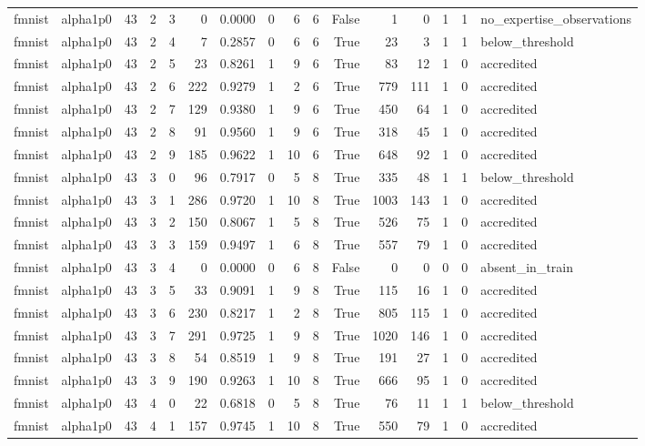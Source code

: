 \begin{tabular}{llrrrrrrrrrrrrrl}
fmnist & alpha1p0 & 43 & 2 & 3 & 0 & 0.0000 & 0 & 6 & 6 & False & 1 & 0 & 1 & 1 & no\_expertise\_observations \\
fmnist & alpha1p0 & 43 & 2 & 4 & 7 & 0.2857 & 0 & 6 & 6 & True & 23 & 3 & 1 & 1 & below\_threshold \\
fmnist & alpha1p0 & 43 & 2 & 5 & 23 & 0.8261 & 1 & 9 & 6 & True & 83 & 12 & 1 & 0 & accredited \\
fmnist & alpha1p0 & 43 & 2 & 6 & 222 & 0.9279 & 1 & 2 & 6 & True & 779 & 111 & 1 & 0 & accredited \\
fmnist & alpha1p0 & 43 & 2 & 7 & 129 & 0.9380 & 1 & 9 & 6 & True & 450 & 64 & 1 & 0 & accredited \\
fmnist & alpha1p0 & 43 & 2 & 8 & 91 & 0.9560 & 1 & 9 & 6 & True & 318 & 45 & 1 & 0 & accredited \\
fmnist & alpha1p0 & 43 & 2 & 9 & 185 & 0.9622 & 1 & 10 & 6 & True & 648 & 92 & 1 & 0 & accredited \\
fmnist & alpha1p0 & 43 & 3 & 0 & 96 & 0.7917 & 0 & 5 & 8 & True & 335 & 48 & 1 & 1 & below\_threshold \\
fmnist & alpha1p0 & 43 & 3 & 1 & 286 & 0.9720 & 1 & 10 & 8 & True & 1003 & 143 & 1 & 0 & accredited \\
fmnist & alpha1p0 & 43 & 3 & 2 & 150 & 0.8067 & 1 & 5 & 8 & True & 526 & 75 & 1 & 0 & accredited \\
fmnist & alpha1p0 & 43 & 3 & 3 & 159 & 0.9497 & 1 & 6 & 8 & True & 557 & 79 & 1 & 0 & accredited \\
fmnist & alpha1p0 & 43 & 3 & 4 & 0 & 0.0000 & 0 & 6 & 8 & False & 0 & 0 & 0 & 0 & absent\_in\_train \\
fmnist & alpha1p0 & 43 & 3 & 5 & 33 & 0.9091 & 1 & 9 & 8 & True & 115 & 16 & 1 & 0 & accredited \\
fmnist & alpha1p0 & 43 & 3 & 6 & 230 & 0.8217 & 1 & 2 & 8 & True & 805 & 115 & 1 & 0 & accredited \\
fmnist & alpha1p0 & 43 & 3 & 7 & 291 & 0.9725 & 1 & 9 & 8 & True & 1020 & 146 & 1 & 0 & accredited \\
fmnist & alpha1p0 & 43 & 3 & 8 & 54 & 0.8519 & 1 & 9 & 8 & True & 191 & 27 & 1 & 0 & accredited \\
fmnist & alpha1p0 & 43 & 3 & 9 & 190 & 0.9263 & 1 & 10 & 8 & True & 666 & 95 & 1 & 0 & accredited \\
fmnist & alpha1p0 & 43 & 4 & 0 & 22 & 0.6818 & 0 & 5 & 8 & True & 76 & 11 & 1 & 1 & below\_threshold \\
fmnist & alpha1p0 & 43 & 4 & 1 & 157 & 0.9745 & 1 & 10 & 8 & True & 550 & 79 & 1 & 0 & accredited \\

\end{tabular}
